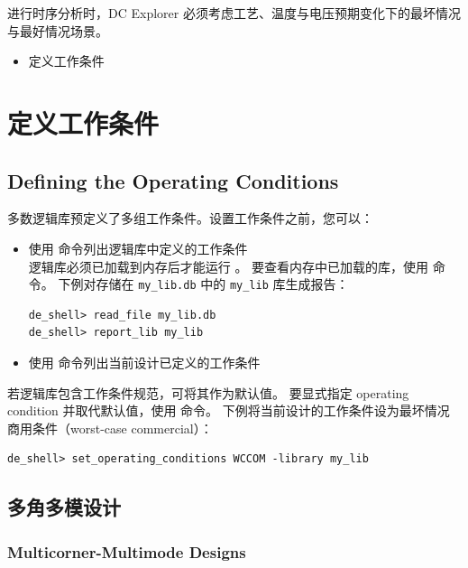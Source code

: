 进行时序分析时，DC Explorer 必须考虑工艺、温度与电压预期变化下的最坏情况与最好情况场景。

\begin{seeAlsoBox}
\begin{itemize}
  \item 定义工作条件
\end{itemize}
\end{seeAlsoBox}

\section{定义工作条件}
\subsection*{Defining the Operating Conditions}

多数逻辑库预定义了多组工作条件。设置工作条件之前，您可以：
\begin{itemize}
  \item 使用  命令列出逻辑库中定义的工作条件\\
        逻辑库必须已加载到内存后才能运行 。
        要查看内存中已加载的库，使用  命令。
        下例对存储在 \texttt{my\_lib.db} 中的 \texttt{my\_lib} 库生成报告：
\begin{lstlisting}
de_shell> read_file my_lib.db
de_shell> report_lib my_lib
\end{lstlisting}
  \item 使用  命令列出当前设计已定义的工作条件
\end{itemize}

若逻辑库包含工作条件规范，可将其作为默认值。
要显式指定 operating condition 并取代默认值，使用  命令。
下例将当前设计的工作条件设为最坏情况商用条件（worst-case commercial）：
\begin{lstlisting}
de_shell> set_operating_conditions WCCOM -library my_lib
\end{lstlisting}

\subsection{多角多模设计}
\subsubsection*{Multicorner-Multimode Designs}


